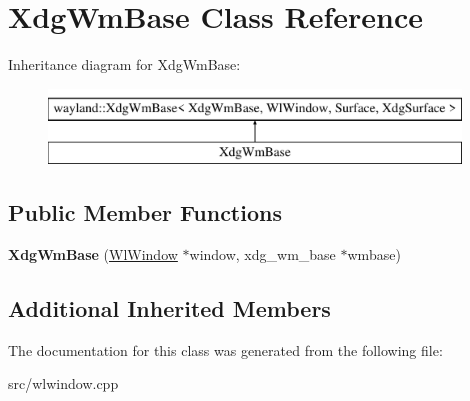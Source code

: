 \hypertarget{classXdgWmBase}{}\section{Xdg\+Wm\+Base Class Reference}
\label{classXdgWmBase}
Inheritance diagram for Xdg\+Wm\+Base\+:\begin{figure}[H]
\begin{center}
\leavevmode
\includegraphics[height=2.000000cm]{classXdgWmBase}
\end{center}
\end{figure}
\subsection*{Public Member Functions}
\begin{DoxyCompactItemize}
\item 
\mbox{\label{classXdgWmBase_ac0c41a837d8603afcff9de9dc340e5a2}} 
{\bfseries Xdg\+Wm\+Base} (\mbox{\hyperlink{classWlWindow}{Wl\+Window}} $\ast$window, xdg\+\_\+wm\+\_\+base $\ast$wmbase)
\end{DoxyCompactItemize}
\subsection*{Additional Inherited Members}


The documentation for this class was generated from the following file\+:\begin{DoxyCompactItemize}
\item 
src/wlwindow.\+cpp\end{DoxyCompactItemize}
